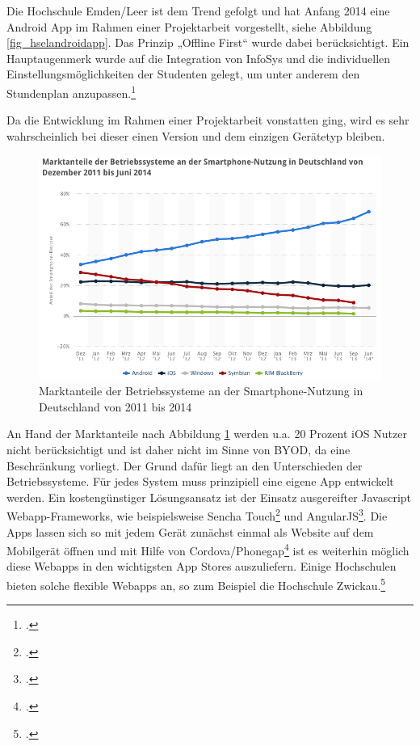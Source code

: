 Die Hochschule Emden/Leer ist dem Trend gefolgt und hat Anfang 2014 eine Android App im Rahmen einer Projektarbeit vorgestellt, siehe Abbildung \ref{fig_hselandroidapp}. Das Prinzip „Offline First“ wurde dabei berücksichtigt. Ein Hauptaugenmerk wurde auf die Integration von InfoSys und die individuellen Einstellungsmöglichkeiten der Studenten gelegt, um unter anderem den Stundenplan anzupassen.\footcite{hsel_immer_up_to_date_2014}

Da die Entwicklung im Rahmen einer Projektarbeit vonstatten ging, wird es sehr wahrscheinlich bei dieser einen Version und dem einzigen Gerätetyp bleiben.

\begin{figure}[h!]
	\centering
	\includegraphics[width=\textwidth]{kapitel/gruppe1_2/bilder/marktanteile}
	\caption{Marktanteile der Betriebssysteme an der Smartphone-Nutzung in Deutschland von 2011 bis 2014\protect\footnotemark}
	\label{fig_marktanteile}
\end{figure}

An Hand der Marktanteile nach Abbildung \ref{fig_marktanteile} werden u.a. 20 Prozent iOS Nutzer nicht berücksichtigt und ist daher nicht im Sinne von BYOD, da eine Beschränkung vorliegt. Der Grund dafür liegt an den Unterschieden der Betriebssysteme. Für jedes System muss prinzipiell eine eigene App entwickelt werden. Ein kostengünstiger Lösungsansatz ist der Einsatz ausgereifter Javascript Webapp-Frameworks, wie beispielsweise Sencha Touch\footcite{sencha_touch_2015} und AngularJS\footcite{angularjs_2015}. Die Apps lassen sich so mit jedem Gerät zunächst einmal als Website auf dem Mobilgerät öffnen und mit Hilfe von Cordova/Phonegap\footcite{apache_cordova_2013} ist es weiterhin möglich diese Webapps in den wichtigsten App Stores auszuliefern. Einige Hochschulen bieten solche flexible Webapps an, so zum Beispiel die Hochschule Zwickau.\footcite{whz_webapp_2015}

